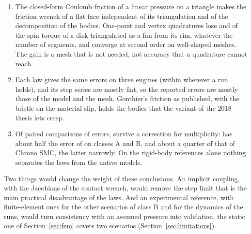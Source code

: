 \begin{enumerate}
  the convergence of  on a journal in a hole with clearance.
\item The closed-form Coulomb friction of a linear pressure on a triangle makes the friction
  wrench of a flat face independent of its triangulation and of the decomposition of the
  bodies. One-point and vertex quadratures lose 
  and  of the spin torque of a disk triangulated
  as a fan from its rim, whatever the number of segments, and converge at second order on
  well-shaped meshes. The gain is a mesh that is not needed, not accuracy that a quadrature
  cannot reach.
\item Each law gives the same errors on three engines (within 
  wherever a run holds), and its step series are mostly flat, so the reported errors are
  mostly those of the model and the mesh. Gonthier's friction as published, with the bristle on
  the material slip, holds the bodies that the variant of the 2018 thesis lets creep.
\item Of  paired comparisons of errors,  survive
  a correction for multiplicity:  has about half the error of 
  on classes A and B, and about a quarter of that of Chrono SMC, the latter narrowly. On the
  rigid-body references alone nothing separates the laws from the native models.
\end{enumerate}

Two things would change the weight of these conclusions. An implicit coupling, with the
Jacobians of the contact wrench, would remove the step limit that is the main practical
disadvantage of the laws. And an experimental reference, with finite-element ones for the
other scenarios of class B and for the dynamics of the runs, would turn consistency with an
assumed pressure into validation; the static one of Section~\ref{sec:fem} covers two scenarios
(Section~\ref{sec:limitations}).
